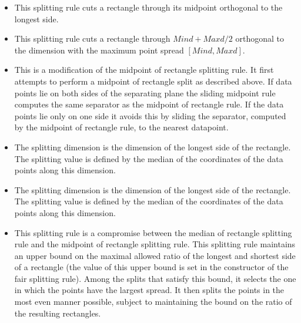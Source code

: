\begin{itemize}

\item {}

This splitting rule cuts a rectangle through its midpoint orthogonal
to the longest side.

\item {}

This splitting rule cuts a rectangle through $Mind+Maxd/2$ orthogonal
to the dimension with the maximum point spread $[Mind,Maxd]$.

\item {}

This is a modification of the midpoint of rectangle splitting rule.
It first attempts to perform a midpoint of rectangle split as
described above. If data points lie on both sides of the separating
plane the sliding midpoint rule computes the same separator as
the midpoint of rectangle rule. If the data points lie only on one
side it avoids this by sliding the separator, computed by
the midpoint of rectangle rule, to the nearest datapoint.

\item {}

The splitting dimension is the dimension of the longest side of the rectangle.
The splitting value is defined by the median of the coordinates of the data points
along this dimension.

\item {}

The splitting dimension is the dimension of the longest side of the rectangle.
The splitting value is defined by the median of the coordinates of the data points
along this dimension.

\item {}

This splitting rule is a compromise between the median of rectangle splitting rule
and the midpoint of rectangle splitting rule. This splitting rule maintains an upper
bound on the maximal allowed ratio of the longest and shortest side of
a rectangle (the value of this upper bound is set in the constructor of the
fair splitting rule). Among the splits that satisfy this bound, it selects
the one in which the points have the largest spread.
It then splits the points in the most even manner possible, subject
to maintaining the bound on the ratio of the resulting rectangles.


\end{itemize}
